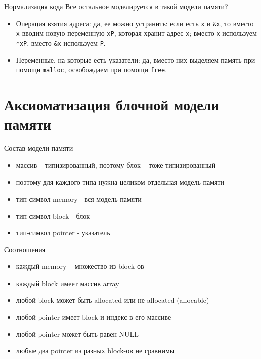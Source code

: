 \documentclass[hyperref={unicode=true}]{beamer}
\begin{document}
    \begin{frame}{Нормализация кода}
    Все остальное моделируется в такой модели памяти?
    \begin{itemize}
    \item Операция взятия адреса: да, ее можно устранить:
    если есть \texttt{x} и \texttt{\&x}, то вместо \texttt{x}
    вводим новую переменную \texttt{xP}, которая хранит адрес \texttt{x};
    вместо \texttt{x} используем \texttt{*xP}, вместо
    \texttt{\&x} используем \texttt{P}.
    \item Переменные, на которые есть указатели: да,
    вместо них выделяем память при помощи \texttt{malloc},
    освобождаем при помощи \texttt{free}.
    \end{itemize}
    \end{frame}

    \section{Аксиоматизация блочной модели памяти}
\fi

    \begin{frame}{Состав модели памяти}
    \begin{itemize}
    \item
    массив -- типизированный, поэтому блок -- тоже типизированный
    \item
    поэтому для каждого типа нужна целиком отдельная модель памяти
    \item
    тип-символ memory - вся модель памяти
    \item
    тип-символ block - блок
    \item
    тип-символ pointer - указатель
    \end{itemize}
    \end{frame}

    \begin{frame}{Соотношения}
    \begin{itemize}
    \item
    каждый memory -- множество из block-ов
    \item
    каждый block имеет массив array
    \item
    любой block может быть allocated или не allocated (allocable)
    \item
    любой pointer имеет block и индекс в его массиве
    \item
    любой pointer может быть равен NULL
    \item
    любые два pointer из разных block-ов не сравнимы
    \end{itemize}
    \end{frame}
\end{document}
